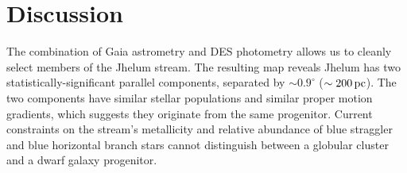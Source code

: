 \documentclass[twocolumn]{aastex62}
\begin{document}
\section{Discussion}
\label{sec:discussion}
The combination of Gaia astrometry and DES photometry allows us to cleanly select members of the Jhelum stream.
The resulting map reveals Jhelum has two statistically-significant parallel components, separated by $\sim0.9^\circ$ ($\sim200\,\rm pc$).
The two components have similar stellar populations and similar proper motion gradients, which suggests they originate from the same progenitor.
Current constraints on the stream's metallicity and relative abundance of blue straggler and blue horizontal branch stars cannot distinguish between a globular cluster and a dwarf galaxy progenitor.
\end{document}
